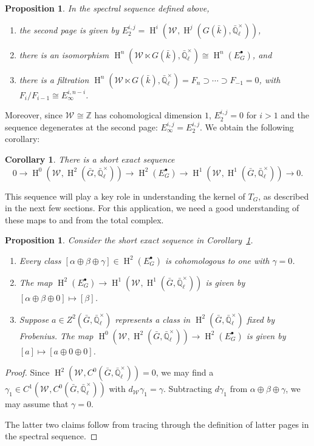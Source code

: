 \documentclass[10pt]{amsart}
\theoremstyle{plain}
\newtheorem{proposition}[theorem]{Proposition}
\newtheorem{corollary}[theorem]{Corollary}
\theoremstyle{definition}
\theoremstyle{remark}
\newcommand{\ZZ}{{\mathbb{Z}}}
\newcommand{\EE}{\mathbb{\bar Q}_\ell}
\newcommand{\bFq}{\bar{k}}
\newcommand{\EEx}{\EE^\times}
\newcommand{\Weil}[1]{\mathcal{W}_{#1}}
\DeclareMathOperator{\Hh}{H}
\newcommand{\TrFrob}[1]{T_{#1}}
\begin{document}
\begin{proposition} In the spectral sequence defined above,
\begin{enumerate}
\item the second page is given by $E_2^{i,j} = \Hh^i(\Weil{}, \Hh^j(G(\bFq), \EEx))$,
\item there is an isomorphism $\Hh^n(\Weil{} \ltimes G(\bFq), \EEx) \cong \Hh^n(E_G^\bullet)$, and
\item there is a filtration $\Hh^n(\Weil{} \ltimes G(\bFq), \EEx) = F_n \supset \cdots \supset F_{-1} = 0$, with $F_i / F_{i-1} \cong E_{\infty}^{i, n-i}$.
\end{enumerate}
\end{proposition}

Moreover, since $\Weil{} \cong \ZZ$ has cohomological dimension $1$, $E_2^{i,j} = 0$ for $i > 1$ and the sequence degenerates at the second page: $E_{\infty}^{i,j} = E_2^{i,j}$. We obtain the following corollary:

\begin{corollary}\label{cor:spectral_ses}
There is a short exact sequence
 \[
    0 \to
    \Hh^0(\Weil{},\Hh^2({\bar G},\EEx)) \to
    \Hh^2(E^\bullet_G) \to
    \Hh^1(\Weil{},\Hh^1({\bar G},\EEx)) \to
    0.
 \]
\end{corollary}

This sequence will play a key role in understanding the kernel of $\TrFrob{G}$, as described in the next few sections.
For this application, we need a good understanding of these maps to and from the total complex.

\begin{proposition} \label{prop:ses_desc}
Consider the short exact sequence in Corollary~\ref{cor:spectral_ses}.
\begin{enumerate}
\item Every class $[\alpha\oplus\beta\oplus\gamma] \in \Hh^2(E^\bullet_G)$ is cohomologous to one with $\gamma=0$.
\item The map $\Hh^2(E^\bullet_G) \to \Hh^1(\Weil{},\Hh^1({\bar G},\EEx))$ is given by $[\alpha\oplus\beta\oplus 0] \mapsto [\beta]$.
\item Suppose $a \in Z^2({\bar G}, \EEx)$ represents a class in $\Hh^2({\bar G},\EEx)$ fixed by Frobenius.
The map $\Hh^0(\Weil{},\Hh^2({\bar G},\EEx)) \to \Hh^2(E^\bullet_G)$ is given by $[a] \mapsto [a \oplus 0 \oplus 0]$.
\end{enumerate}
\end{proposition}
\begin{proof}
Since $\Hh^2(\Weil{}, C^0({\bar G}, \EEx)) = 0$, we may find a $\gamma_1 \in C^1(\Weil{}, C^0({\bar G}, \EEx))$ with $d_{\Weil{}}\gamma_1 = \gamma$.
Subtracting $d \gamma_1$ from $\alpha\oplus\beta\oplus\gamma$, we may assume that $\gamma = 0$.

The latter two claims follow from tracing through the definition of latter pages in the spectral sequence.
\end{proof}
\end{document}
